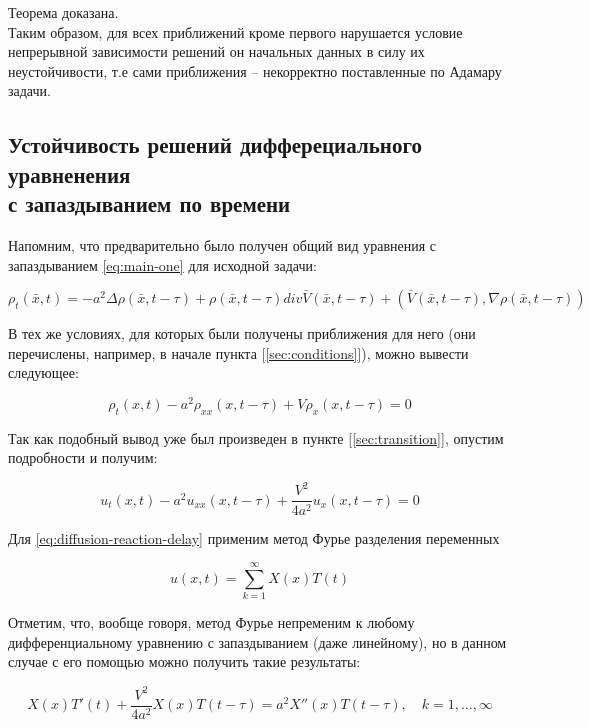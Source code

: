 Теорема доказана.\\

Таким образом, для всех приближений кроме первого нарушается условие непрерывной зависимости решений он начальных данных в силу их неустойчивости, т.е сами приближения \--- некорректно поставленные по Адамару задачи.

\subsection{Устойчивость решений дифферециального уравненения\\с запаздыванием по времени}

Напомним, что предварительно было получен общий вид уравнения с запаздыванием \ref{eq:main-one} для исходной задачи:

\begin{equation*}
\rho_t(\bar{x},t) = -a^2 \Delta \rho(\bar{x},t-\tau) + \rho(\bar{x},t-\tau) div \bar{V}(\bar{x},t-\tau) + (\bar{V}(\bar{x},t-\tau),\nabla \rho(\bar{x},t-\tau))
\end{equation*}

В тех же условиях, для которых были получены приближения для него (они перечислены, например, в начале пункта [\ref{sec:conditions}]), можно вывести следующее:

\begin{equation}
\rho_t (x,t) - a^2 \rho_{xx} (x,t-\tau) + V \rho_x (x,t-\tau) = 0
\end{equation}

Так как подобный вывод уже был произведен в пункте [\ref{sec:transition}], опустим подробности и получим:

\begin{equation}\label{eq:diffusion-reaction-delay}
u_t (x,t) - a^2 u_{xx} (x,t-\tau) + \dfrac{V^2}{4a^2} u_x (x,t-\tau) = 0
\end{equation}

Для \ref{eq:diffusion-reaction-delay} применим метод Фурье разделения переменных

\begin{equation}
u(x,t) = \sum\limits_{k=1}^{\infty} X(x) T(t)
\end{equation}

Отметим, что, вообще говоря, метод Фурье непременим к любому дифференциальному уравнению с запаздыванием (даже линейному), но в данном случае с его помощью можно получить такие результаты:

\begin{equation}
X(x) T'(t) + \dfrac{V^2}{4a^2} X(x) T(t-\tau) =a^2 X''(x) T(t-\tau), \quad k=1,\dots,\infty
\end{equation}

